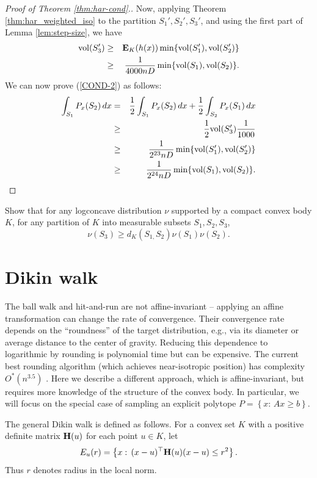 \begin{proof}[Proof of Theorem \ref{thm:har-cond}.]
Now, applying Theorem \ref{thm:har_weighted_iso} to the partition
$S_{1}',S_{2}',S_{3}'$, and using the first part of Lemma \ref{lem:step-size},
we have 
\begin{eqnarray*}
\mathrm{vol}(S_{3}') & \geq & \mathbf{E}_{K}(h(x))\min\{\mathrm{vol}(S_{1}'),\mathrm{vol}(S_{2}')\}\\
 & \geq & \frac{1}{4000nD}\min\{\mathrm{vol}(S_{1}),\mathrm{vol}(S_{2})\}.
\end{eqnarray*}
We can now prove (\ref{COND-2}) as follows: 
\begin{eqnarray*}
\int_{S_{1}}P_{x}(S_{2})\,dx & = & \frac{1}{2}\int_{S_{1}}P_{x}(S_{2})\,dx+\frac{1}{2}\int_{S_{2}}P_{x}(S_{1})\,dx\\
 & \ge & \frac{1}{2}\mathrm{vol}(S_{3}')\frac{1}{1000}\\
 & \ge & \frac{1}{2^{23}nD}\min\{\mathrm{vol}(S_{1}'),\mathrm{vol}(S_{2}')\}\\
 & \ge & \frac{1}{2^{24}nD}\min\{\mathrm{vol}(S_{1}),\mathrm{vol}(S_{2})\}.
\end{eqnarray*}
\end{proof}
\begin{xca}
Show that for any logconcave distribution $\nu$ supported by a compact
convex body $K$, for any partition of $K$ into measurable subsets
$S_{1},S_{2},S_{3}$, 
\[
\nu(S_{3})\ge d_{K}(S_{1,}S_{2})\nu(S_{1})\nu(S_{2}).
\]
\end{xca}


\section{Dikin walk}

The ball walk and hit-and-run are not affine-invariant -- applying
an affine transformation can change the rate of convergence. Their
convergence rate depends on the ``roundness'' of the target distribution,
e.g., via its diameter or average distance to the center of gravity.
Reducing this dependence to logarithmic by rounding is polynomial
time but can be expensive. The current best rounding algorithm (which
achieves near-isotropic position) has complexity $O^{*}(n^{3.5})$
\cite{JLLV26}. Here we describe a different approach, which is affine-invariant,
but requires more knowledge of the structure of the convex body. In
particular, we will focus on the special case of sampling an explicit
polytope $P=\left\{ x:\,Ax\ge b\right\} $.

The general Dikin walk is defined as follows. For a convex set $K$
with a positive definite matrix $\mathbf{H}(u)$ for each point $u\in K$,
let
\[
E_{u}(r)=\left\{ x:\,(x-u)^{\top}\mathbf{H}(u)(x-u)\le r^{2}\right\} .
\]
Thus $r$ denotes radius in the local norm. 


